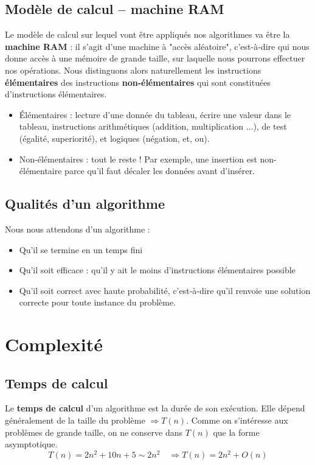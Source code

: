 \documentclass[12pt,a4paper]{book}
\begin{document}
\subsection{Modèle de calcul -- machine RAM}
Le modèle de calcul sur lequel vont être appliqués nos algorithmes va être la \textbf{machine RAM} : il s'agit d'une machine à "accès aléatoire", c'est-à-dire qui nous donne accès à une mémoire de grande taille, sur laquelle nous pourrons effectuer nos opérations. Nous distinguons alors naturellement les instructions \textbf{élémentaires} des instructions \textbf{non-élémentaires} qui sont constituées d'instructions élémentaires.
\begin{itemize}
\item Élémentaires : lecture d'une donnée du tableau, écrire une valeur dans le tableau, instructions arithmétiques (addition, multiplication ...), de test (égalité, superiorité), et logiques (négation, et, ou).
\item Non-élémentaires : tout le reste ! Par exemple, une insertion est non-élémentaire parce qu'il faut décaler les données avant d'insérer.
\end{itemize}

\subsection{Qualités d'un algorithme}
Nous nous attendons d'un algorithme :
\begin{itemize}
\item Qu'il se termine en un temps fini 
\item Qu'il soit efficace : qu'il y ait le moins d'instructions élémentaires possible
\item Qu'il soit correct avec haute probabilité, c'est-à-dire qu'il renvoie une solution correcte pour toute instance du problème.
\end{itemize}
\section{Complexité}
\subsection{Temps de calcul}
Le \textbf{temps de calcul} d'un algorithme est la durée de son exécution. Elle dépend généralement de la taille du problème $\Rightarrow T(n)$. Comme on s'intéresse aux problèmes de grande taille, on ne conserve dans $T(n)$ que la forme asymptotique.
$$T(n) = 2n^2 + 10n+5 \sim 2n^2 \quad \Rightarrow T(n) = 2n^2 + O(n)$$
\end{document}
